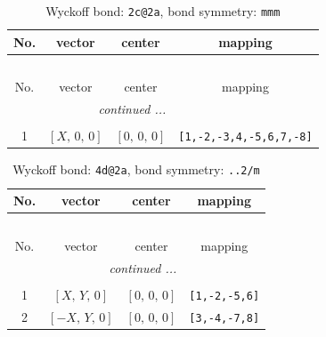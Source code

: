 \documentclass[fleqn,8pt]{jsarticle}
\begin{document}
\renewcommand{\arraystretch}{1.2}
\begin{longtable}{cccc}
\caption{Wyckoff bond: {\tt 2c@2a}, bond symmetry: {\tt mmm}}
 \\
 \hline \hline
No. & vector & center & mapping \\ \hline \endfirsthead

\multicolumn{3}{l}{\tablename\ \thetable{}} \\
 \hline \hline
No. & vector & center & mapping \\ \hline \endhead

 \hline \hline
\multicolumn{3}{r}{\footnotesize\it continued ...} \\ \endfoot

 \hline \hline
\multicolumn{3}{r}{} \\ \endlastfoot

1 & $\left[ X,\, 0,\, 0 \right]$ & $\left[ 0,\, 0,\, 0 \right]$ & {\tt [1,-2,-3,4,-5,6,7,-8]} \\
\end{longtable}
\renewcommand{\arraystretch}{1.2}
\begin{longtable}{cccc}
\caption{Wyckoff bond: {\tt 4d@2a}, bond symmetry: {\tt ..2/m}}
 \\
 \hline \hline
No. & vector & center & mapping \\ \hline \endfirsthead

\multicolumn{3}{l}{\tablename\ \thetable{}} \\
 \hline \hline
No. & vector & center & mapping \\ \hline \endhead

 \hline \hline
\multicolumn{3}{r}{\footnotesize\it continued ...} \\ \endfoot

 \hline \hline
\multicolumn{3}{r}{} \\ \endlastfoot

1 & $\left[ X,\, Y,\, 0 \right]$ & $\left[ 0,\, 0,\, 0 \right]$ & {\tt [1,-2,-5,6]} \\ \hline
2 & $\left[ - X,\, Y,\, 0 \right]$ & $\left[ 0,\, 0,\, 0 \right]$ & {\tt [3,-4,-7,8]} \\
\end{longtable}
\renewcommand{\arraystretch}{1.2}
\end{document}
